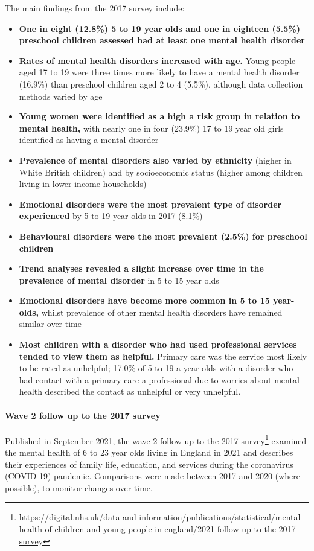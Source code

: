 The main findings from the 2017 survey include:
\begin{itemize}[noitemsep]
    \item {\bfseries One in eight (12.8\%) 5 to 19 year olds and one in eighteen (5.5\%) preschool children assessed had at least one mental health disorder}
    \item {\bfseries Rates of mental health disorders increased with age.} Young people aged 17 to 19 were three times more likely to have a mental health disorder (16.9\%) than preschool children aged 2 to 4 (5.5\%), although data collection methods varied by age
    \item {\bfseries Young women were identified as a high a risk group in relation to mental health,} with nearly one in four (23.9\%) 17 to 19 year old girls identified as having a mental disorder
    \item {\bfseries Prevalence of mental disorders also varied by ethnicity} (higher in White British children) and by socioeconomic status (higher among children living in lower income households)
    \item {\bfseries Emotional disorders were the most prevalent type of disorder experienced} by 5 to 19 year olds in 2017 (8.1\%)
    \item {\bfseries Behavioural disorders were the most prevalent (2.5\%) for preschool children}
    \item {\bfseries Trend analyses revealed a slight increase over time in the prevalence of mental disorder} in 5 to 15 year olds
    \item {\bfseries Emotional disorders have become more common in 5 to 15 year-olds,} whilst prevalence of other mental health disorders have remained similar over time
    \item {\bfseries Most children with a disorder who had used professional services tended to view them as helpful.} Primary care was the service most likely to be rated as unhelpful; 17.0\% of 5 to 19 a year olds with a disorder who had contact with a primary care a professional due to worries about mental health described the contact as unhelpful or very unhelpful.
\end{itemize}

\paragraph{Wave 2 follow up to the 2017 survey}
Published in September 2021, the wave 2 follow up to the 2017 survey\footnote{\url{https://digital.nhs.uk/data-and-information/publications/statistical/mental-health-of-children-and-young-people-in-england/2021-follow-up-to-the-2017-survey}} examined the mental health of 6 to 23 year olds living in England in 2021 and describes their experiences of family life, education, and services during the coronavirus (COVID-19) pandemic. Comparisons were made between 2017 and 2020 (where possible), to monitor changes over time.

